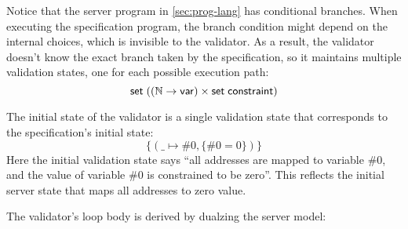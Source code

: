 Notice that the server program in \autoref{sec:prog-lang} has conditional
branches.  When executing the specification program, the branch condition might
depend on the internal choices, which is invisible to the validator.  As a
result, the validator doesn't know the exact branch taken by the specification,
so it maintains multiple validation states, one for each possible execution
path:
\[\mathsf{set}\;((\mathbb N\to\mathsf{var})\times\mathsf{set}\;\mathsf{constraint})\]

The initial state of the validator is a single validation state that corresponds
to the specification's initial state:
\[\{(\_\mapsto\#0,\{\#0=0\})\}\]
Here the initial validation state says ``all addresses are mapped to variable
$\#0$, and the value of variable $\#0$ is constrained to be zero''.  This
reflects the initial server state that maps all addresses to zero value.

The validator's loop body is derived by dualzing the server model:

